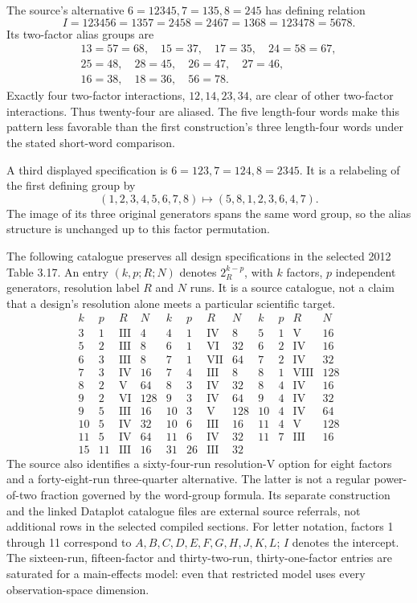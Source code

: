 The source's alternative \(6=12345,7=135,8=245\) has defining relation
\[
 I=123456=1357=2458=2467=1368=123478=5678.
\]
Its two-factor alias groups are
\[
\begin{gathered}
13=57=68,\quad15=37,\quad17=35,\quad24=58=67,\\
25=48,\quad28=45,\quad26=47,\quad27=46,\\
16=38,\quad18=36,\quad56=78.
\end{gathered}
\]
Exactly four two-factor interactions, \(12,14,23,34\), are clear of other
two-factor interactions. Thus twenty-four are aliased. The five length-four
words make this pattern less favorable than the first construction's three
length-four words under the stated short-word comparison.

A third displayed specification is \(6=123,7=124,8=2345\). It is a
relabeling of the first defining group by
\[
 (1,2,3,4,5,6,7,8)\longmapsto(5,8,1,2,3,6,4,7).
\]
The image of its three original generators spans the same word group,
so the alias structure is unchanged up to this factor permutation.

The following catalogue preserves all design specifications in the selected
2012 Table 3.17. An entry \((k,p;R;N)\) denotes \(2^{k-p}_R\), with
\(k\) factors, \(p\) independent generators, resolution label \(R\)
and \(N\) runs. It is a source catalogue, not a claim that a design's
resolution alone meets a particular scientific target.
\[
\begin{array}{rrrr|rrrr|rrrr}
k&p&R&N&k&p&R&N&k&p&R&N\\\hline
3&1&\mathrm{III}&4&4&1&\mathrm{IV}&8&5&1&\mathrm V&16\\
5&2&\mathrm{III}&8&6&1&\mathrm{VI}&32&6&2&\mathrm{IV}&16\\
6&3&\mathrm{III}&8&7&1&\mathrm{VII}&64&7&2&\mathrm{IV}&32\\
7&3&\mathrm{IV}&16&7&4&\mathrm{III}&8&8&1&\mathrm{VIII}&128\\
8&2&\mathrm V&64&8&3&\mathrm{IV}&32&8&4&\mathrm{IV}&16\\
9&2&\mathrm{VI}&128&9&3&\mathrm{IV}&64&9&4&\mathrm{IV}&32\\
9&5&\mathrm{III}&16&10&3&\mathrm V&128&10&4&\mathrm{IV}&64\\
10&5&\mathrm{IV}&32&10&6&\mathrm{III}&16&11&4&\mathrm V&128\\
11&5&\mathrm{IV}&64&11&6&\mathrm{IV}&32&11&7&\mathrm{III}&16\\
15&11&\mathrm{III}&16&31&26&\mathrm{III}&32&&&&
\end{array}
\]
The source also identifies a sixty-four-run resolution-V option for eight
factors and a forty-eight-run three-quarter alternative. The latter is
not a regular power-of-two fraction governed by the word-group formula.
Its separate construction and the linked Dataplot catalogue files are
external source referrals, not additional rows in the selected compiled
sections. For letter notation, factors 1 through 11 correspond to
\(A,B,C,D,E,F,G,H,J,K,L\); \(I\) denotes the intercept.
The sixteen-run, fifteen-factor and thirty-two-run, thirty-one-factor
entries are saturated for a main-effects model: even that restricted model
uses every observation-space dimension.


